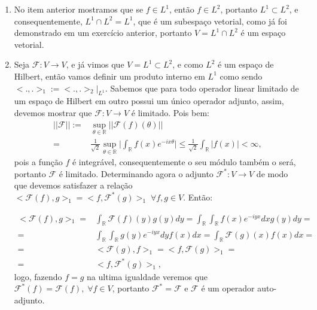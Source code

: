\documentclass{article}
\begin{document}
\begin{enumerate}
\begin{enumerate}
				\item No item anterior mostramos que se $f \in L^{1}$, então $f \in L^{2}$, portanto $L^{1} \subset L^{2}$, e consequentemente, $L^{1} \cap L^{2} = L^{1}$, que é um subespaço vetorial, como já foi demonstrado em um exercício anterior, portanto $V= L^{1} \cap L^{2}$ é um espaço vetorial.
				
				\item Seja $\mathcal{F}:V \to V$, e já vimos que $V = L^{1} \subset L^{2}$, e como $L^{2}$ é um espaço de Hilbert, então vamos definir um produto interno em $L^{1}$ como sendo $<.,.>_{1} := <.,.>_{2}|_{L^{1}}$. Sabemos que para todo operador linear limitado de um espaço de Hilbert em outro possui um único operador adjunto, assim, devemos mostrar que $\mathcal{F}:V \to V$ é limitado. Pois bem:
				$$
				\begin{aligned}
				||\mathcal{F}|| 
				:= & \sup_{\theta \in \mathbb{R}}||\mathcal{F}(f)(\theta)||\\
				= & \frac{1}{\sqrt{2}}\sup_{\theta \in \mathbb{R}} \Big| \int_{\mathbb{R}}f(x)e^{-ix\theta} \Big| \leq \frac{1}{\sqrt{2}} \int_{\mathbb{R}}|f(x)| < \infty, 
				\end{aligned}
				$$
				pois a função $f$ é integrável, consequentemente o seu módulo também o será, portanto $\mathcal{F}$ é limitado. Determinando agora o adjunto $\mathcal{F}^{*} :  V \to V$ de modo que devemos satisfazer a relação $<\mathcal{F}(f), g>_{1} = <f, \mathcal{F}^{*}(g)>_{1}\; \forall f, g \in V$. Então:
				
				$$
				\begin{aligned}
				<\mathcal{F}(f), g>_{1} 
				= & \int_{\mathbb{R}} \mathcal{F}(f)(y)g(y)dy = \int_{\mathbb{R}} \int_{\mathbb{R}} f(x)e^{-iyx} dx g(y) dy = \\
				= & \int_{\mathbb{R}} \int_{\mathbb{R}}g(y)e^{-iyx}  dy f(x) dx = \int_{\mathbb{R}} \mathcal{F}(g)(x) f(x) dx = \\
				= & <\mathcal{F}(g), f>_{1} = <f, \mathcal{F}(g)>_{1} = \\
				= & <f, \mathcal{F}^{*}(g)>_{1},
				\end{aligned}
				$$
				logo, fazendo $f=g$ na ultima igualdade veremos que $\mathcal{F}^{*}(f) = \mathcal{F}(f), \; \forall f \in V$, portanto $\mathcal{F}^{*} = \mathcal{F}$ e $\mathcal{F}$ é um operador auto-adjunto.
				\end{enumerate}
		
	\end{enumerate}
		
\end{document}
